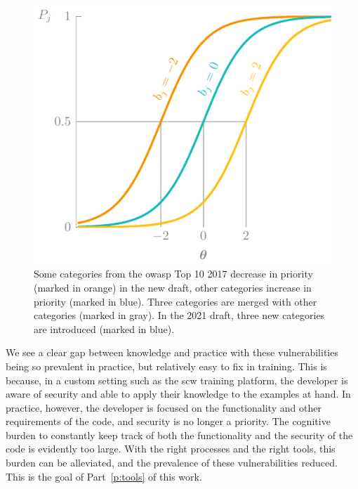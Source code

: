 \begin{figure}
    \centering
    \includegraphics[page=23, width=\textwidth]{03-education/figures/tikzfigures.pdf}
  \caption[OWASP Top 10 2021 draft]{Some categories from the \gls{owasp} Top 10 2017 decrease in priority (marked in orange) in the new draft, other categories increase in priority (marked in blue). Three categories are merged with other categories (marked in gray). In the 2021 draft, three new categories are introduced (marked in blue).}
  \label{fig:newowasptop10} 
\end{figure}


We see a clear gap between knowledge and practice with these vulnerabilities being so prevalent in practice, but relatively easy to fix in training.
This is because, in a custom setting such as the \gls{scw} training platform, the developer is aware of security and able to apply their knowledge to the examples at hand.
In practice, however, the developer is focused on the functionality and other requirements of the code, and security is no longer a priority.
The cognitive burden to constantly keep track of both the functionality and the security of the code is evidently too large.
With the right processes and the right tools, this burden can be alleviated, and the prevalence of these vulnerabilities reduced.
This is the goal of Part~\ref{p:tools} of this work.


